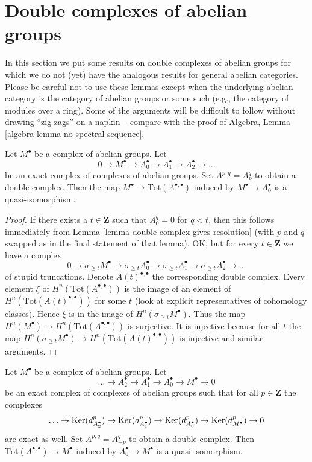 \section{Double complexes of abelian groups}
\label{section-double-complexes-abelian-groups}

\noindent
In this section we put some results on double complexes of abelian groups
for which we do not (yet) have the analogous results for general abelian
categories. Please be careful not to use these lemmas except when the
underlying abelian category is the category of abelian groups or some
such (e.g., the category of modules over a ring). Some of the arguments
will be difficult to follow without drawing ``zig-zags'' on a napkin --
compare with the proof of
Algebra, Lemma \ref{algebra-lemma-no-spectral-sequence}.

\begin{lemma}
\label{lemma-right-resolution-gives-qis}
Let $M^\bullet$ be a complex of abelian groups. Let
$$
0 \to M^\bullet \to A_0^\bullet \to A_1^\bullet \to A_2^\bullet \to \ldots
$$
be an exact complex of complexes of abelian groups. Set
$A^{p, q} = A_p^q$ to obtain a double complex.
Then the map $M^\bullet \to \text{Tot}(A^{\bullet, \bullet})$
induced by $M^\bullet \to A_0^\bullet$ is a quasi-isomorphism.
\end{lemma}

\begin{proof}
If there exists a $t \in \mathbf{Z}$ such that $A_0^q = 0$ for $q < t$, then
this follows immediately from
Lemma \ref{lemma-double-complex-gives-resolution}
(with $p$ and $q$ swapped as in the final statement of that lemma).
OK, but for every $t \in \mathbf{Z}$ we have a complex
$$
0 \to
\sigma_{\geq t}M^\bullet \to
\sigma_{\geq t}A_0^\bullet \to
\sigma_{\geq t}A_1^\bullet \to
\sigma_{\geq t}A_2^\bullet \to \ldots
$$
of stupid truncations. Denote $A(t)^{\bullet, \bullet}$ the corresponding
double complex. Every element $\xi$ of $H^n(\text{Tot}(A^{\bullet, \bullet}))$
is the image of an element of $H^n(\text{Tot}(A(t)^{\bullet, \bullet}))$
for some $t$ (look at explicit representatives of cohomology classes).
Hence $\xi$ is in the image of $H^n(\sigma_{\geq t}M^\bullet)$.
Thus the map $H^n(M^\bullet) \to H^n(\text{Tot}(A^{\bullet, \bullet}))$
is surjective. It is injective because for all $t$ the map
$H^n(\sigma_{\geq t}M^\bullet) \to H^n(\text{Tot}(A(t)^{\bullet, \bullet}))$
is injective and similar arguments.
\end{proof}

\begin{lemma}
\label{lemma-good-resolution-gives-qis}
Let $M^\bullet$ be a complex of abelian groups. Let
$$
\ldots \to A_2^\bullet \to A_1^\bullet \to A_0^\bullet \to M^\bullet \to 0
$$
be an exact complex of complexes of abelian groups such that for all
$p \in \mathbf{Z}$ the complexes
$$
\ldots \to \mathop{\mathrm{Ker}}(d_{A_2^\bullet}^p) \to \mathop{\mathrm{Ker}}(d_{A_1^\bullet}^p)
\to \mathop{\mathrm{Ker}}(d_{A_0^\bullet}^p) \to \mathop{\mathrm{Ker}}(d_{M^\bullet}^p) \to 0
$$
are exact as well. Set $A^{p, q} = A_{-p}^q$ to obtain a double
complex. Then $\text{Tot}(A^{\bullet, \bullet}) \to M^\bullet$
induced by $A_0^\bullet \to M^\bullet$ is a quasi-isomorphism.
\end{lemma}

